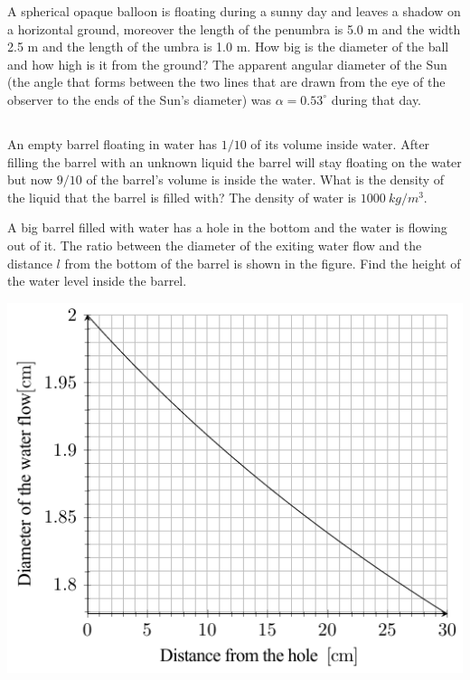 \documentclass[11pt]{article}
\begin{document}

\probeng
A spherical opaque balloon is floating during a sunny day and leaves a shadow on a horizontal ground, moreover the length of the penumbra is 5.0 m and the width 2.5 m and the length of the umbra is 1.0 m. How big is the diameter of the ball and how high is it from the ground? The apparent angular diameter of the Sun (the angle that forms between the two lines that are drawn from the eye of the observer to the ends of the Sun’s diameter) was $\alpha =0.53^\circ$ during that day.
\probend
\bigskip
\newpage\subsection{\protect{}}


\probeng
An empty barrel floating in water has $1/10$ of its volume inside water. After filling the barrel with an unknown liquid the barrel will stay floating on the water but now $9/10$ of the barrel’s volume is inside the water. What is the density of the liquid that the barrel is filled with? The density of water is $\SI{1000}{kg/m^3}$.
\probend
\bigskip


\probeng
A big barrel filled with water has a hole in the bottom and the water is flowing out of it. The ratio between the diameter of the exiting water flow and the distance $l$ from the bottom of the barrel is shown in the figure. Find the height of the water level inside the barrel.
\begin{center}
\includegraphics[width = 0.6\linewidth]{2018-v3g-02-juga_ing}
\end{center}
\probend
\bigskip
\end{document}
